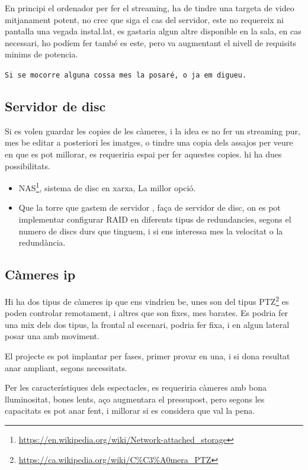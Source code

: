 \documentclass[
  10pt,
]{krantz}
\DeclareRobustCommand{\href}[2]{#2\footnote{\url{#1}}}
\begin{document}
En principi el ordenador per fer el streaming, ha de tindre una targeta de video mitjanament potent, no crec que siga el cas del servidor, este no requereix ni pantalla una vegada instal.lat, es gastaria algun altre disponible en la sala, en cas necessari, ho podíem fer també es este, pero va augmentant el nivell de requisits minims de potencia.

\texttt{Si\ se\ m\textquotesingle{}ocorre\ alguna\ cossa\ mes\ la\ posaré,\ o\ ja\ em\ digueu.}

\hypertarget{servidor-de-disc}{%
\subsection{Servidor de disc}\label{servidor-de-disc}}

Si es volen guardar les copies de les càmeres, i la idea es no fer un streaming pur, mes be editar a posteriori les imatges, o tindre una copia dels assajos per veure en que es pot millorar, es requeriria espai per fer aquestes copies. hi ha dues possibilitats.

\begin{itemize}
\item
  \href{https://en.wikipedia.org/wiki/Network-attached_storage}{NAS}, sistema de disc en xarxa, La millor opció.
\item
  Que la torre que gastem de servidor , faça de servidor de disc, on es pot implementar configurar RAID en diferents tipus de redundancies, segons el numero de discs durs que tinguem, i si ens interessa mes la velocitat o la redundància.
\end{itemize}

\hypertarget{cuxe0meres-ip}{%
\subsection{Càmeres ip}\label{cuxe0meres-ip}}

Hi ha dos tipus de càmeres ip que ens vindrien be, unes son del tipus \href{https://ca.wikipedia.org/wiki/C\%C3\%A0mera_PTZ}{PTZ} es poden controlar remotament, i altres que son fixes, mes barates. Es podria fer una mix dels dos tipus, la frontal al escenari, podria fer fixa, i en algun lateral posar una amb moviment.

El projecte es pot implantar per fases, primer provar en una, i si dona resultat anar ampliant, segons necessitats.

Per les característiques dels espectacles, es requeriria càmeres amb bona lluminositat, bones lents, aço augmentara el pressupost, pero segons les capacitats es pot anar fent, i millorar si es considera que val la pena.
\end{document}
